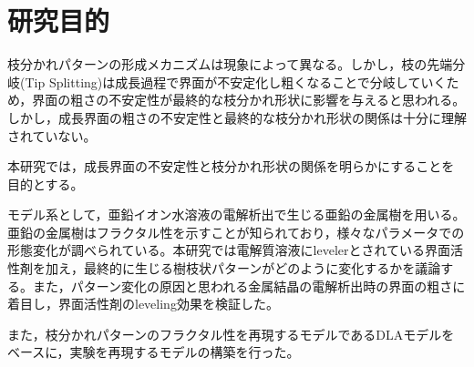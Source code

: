 \documentclass[autodetect-engine,dvi=dvipdfmx,a4paper,ja=standard]{bxjsbook}
\begin{document}

\thispagestyle{empty}

\restoregeometry
{}

\tableofcontents
{}





\section{研究目的}
枝分かれパターンの形成メカニズムは現象によって異なる。しかし，枝の先端分岐(Tip Splitting)は成長過程で界面が不安定化し粗くなることで分岐していくため，界面の粗さの不安定性が最終的な枝分かれ形状に影響を与えると思われる。しかし，成長界面の粗さの不安定性と最終的な枝分かれ形状の関係は十分に理解されていない。

本研究では，成長界面の不安定性と枝分かれ形状の関係を明らかにすることを目的とする。

モデル系として，亜鉛イオン水溶液の電解析出で生じる亜鉛の金属樹を用いる。亜鉛の金属樹はフラクタル性を示すことが知られており\cite{matsushita1984fractal}，様々なパラメータでの形態変化が調べられている\cite{suda2003temperature}。本研究では電解質溶液にlevelerとされている界面活性剤を加え，最終的に生じる樹枝状パターンがどのように変化するかを議論する。また，パターン変化の原因と思われる金属結晶の電解析出時の界面の粗さに着目し，界面活性剤のleveling効果を検証した。

また，枝分かれパターンのフラクタル性を再現するモデルであるDLAモデル\cite{witten1981diffusion}をベースに，実験を再現するモデルの構築を行った。



















\end{document}
